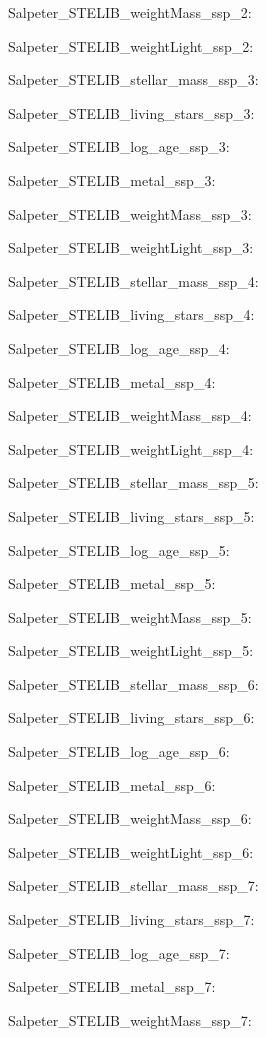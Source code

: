 \item Salpeter\_STELIB\_weightMass\_ssp\_2: 
\item Salpeter\_STELIB\_weightLight\_ssp\_2: 
\item Salpeter\_STELIB\_stellar\_mass\_ssp\_3: 
\item Salpeter\_STELIB\_living\_stars\_ssp\_3: 
\item Salpeter\_STELIB\_log\_age\_ssp\_3: 
\item Salpeter\_STELIB\_metal\_ssp\_3: 
\item Salpeter\_STELIB\_weightMass\_ssp\_3: 
\item Salpeter\_STELIB\_weightLight\_ssp\_3: 
\item Salpeter\_STELIB\_stellar\_mass\_ssp\_4: 
\item Salpeter\_STELIB\_living\_stars\_ssp\_4: 
\item Salpeter\_STELIB\_log\_age\_ssp\_4: 
\item Salpeter\_STELIB\_metal\_ssp\_4: 
\item Salpeter\_STELIB\_weightMass\_ssp\_4: 
\item Salpeter\_STELIB\_weightLight\_ssp\_4: 
\item Salpeter\_STELIB\_stellar\_mass\_ssp\_5: 
\item Salpeter\_STELIB\_living\_stars\_ssp\_5: 
\item Salpeter\_STELIB\_log\_age\_ssp\_5: 
\item Salpeter\_STELIB\_metal\_ssp\_5: 
\item Salpeter\_STELIB\_weightMass\_ssp\_5: 
\item Salpeter\_STELIB\_weightLight\_ssp\_5: 
\item Salpeter\_STELIB\_stellar\_mass\_ssp\_6: 
\item Salpeter\_STELIB\_living\_stars\_ssp\_6: 
\item Salpeter\_STELIB\_log\_age\_ssp\_6: 
\item Salpeter\_STELIB\_metal\_ssp\_6: 
\item Salpeter\_STELIB\_weightMass\_ssp\_6: 
\item Salpeter\_STELIB\_weightLight\_ssp\_6: 
\item Salpeter\_STELIB\_stellar\_mass\_ssp\_7: 
\item Salpeter\_STELIB\_living\_stars\_ssp\_7: 
\item Salpeter\_STELIB\_log\_age\_ssp\_7: 
\item Salpeter\_STELIB\_metal\_ssp\_7: 
\item Salpeter\_STELIB\_weightMass\_ssp\_7: 
